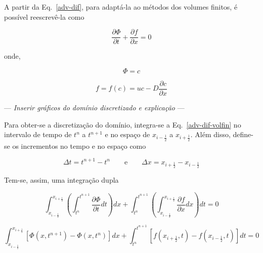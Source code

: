 A partir da Eq.\ \ref{adv-dif}, para adaptá-la ao métodos dos volumes finitos,
é possível reescrevê-la como

\begin{equation}\label{adv-dif-volfin}
    \frac{\partial\Phi}{\partial t} + \frac{\partial f}{\partial x} = 0
\end{equation}

\noindent onde,

\noindent
\begin{minipage}{.4\linewidth}
    \begin{equation}
        \Phi = c
    \end{equation}
\end{minipage}%
\begin{minipage}{.6\linewidth}
    \begin{equation}
        f = f(c) = uc - D\frac{\partial c}{\partial x}
    \end{equation}
\end{minipage}

\bigskip
\begin{center}
    --- \textit{Inserir gráficos do domínio discretizado e explicação} ---
\end{center}
\bigskip

Para obter-se a discretização do domínio, integra-se a Eq.\ \ref{adv-dif-volfin}
no intervalo de tempo de $t^n$ a $t^{n+1}$ e no espaço de $x_{i-\frac{1}{2}}$
a $x_{i+\frac{1}{2}}$. Além disso, define-se os incrementos no tempo e no
espaço como

\begin{equation*}
    \Delta t = t^{n+1} - t^n \qquad\text{e}\qquad \Delta x = x_{i+\frac{1}{2}}
    - x_{i-\frac{1}{2}}
\end{equation*}

Tem-se, assim, uma integração dupla

\begin{equation*}
    \int_{x_{i-\frac{1}{2}}}^{x_{i+\frac{1}{2}}} \left( \int_{t^n}^{t^{n+1}}
    \frac{\partial \Phi}{\partial t}dt \right)dx
    +
    \int_{t^n}^{t^{n+1}} \left(\int_{x_{i-\frac{1}{2}}}^{x_{i+\frac{1}{2}}}
    \frac{\partial f}{\partial x}dx \right)dt
    = 0
\end{equation*}

\begin{equation}\label{int dx}
    \int_{x_{i-\frac{1}{2}}}^{x_{i+\frac{1}{2}}}[\Phi(x,t^{n+1}) -
    \Phi(x,t^n)]dx
    +
    \int_{t^n}^{t^{n+1}} [f(x_{i+\frac{1}{2}},t) - f(x_{i-\frac{1}{2}},t)]dt
    = 0
\end{equation}

